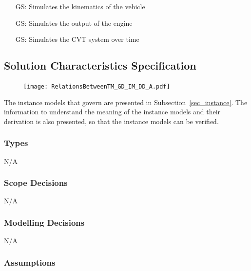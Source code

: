 \documentclass[12pt]{article}
\newcounter{goalnum} %
\begin{document}
\begin{itemize}

\item[GS\refstepcounter{goalnum}\thegoalnum \label{GS1}:]  Simulates the kinematics of the vehicle
\item[GS\refstepcounter{goalnum}\thegoalnum \label{GS2}:]  Simulates the output of the engine
\item[GS\refstepcounter{goalnum}\thegoalnum \label{GS3}:]  Simulates the CVT system over time

\end{itemize}

\subsection{Solution Characteristics Specification}
\begin{figure}[H]
  \texttt{[image: RelationsBetweenTM\_GD\_IM\_DD\_A.pdf]}
\end{figure}

The instance models that govern \progname{} are presented in
Subsection~\ref{sec_instance}.  The information to understand the meaning of the
instance models and their derivation is also presented, so that the instance
models can be verified.

\subsubsection{Types}

N/A

\subsubsection{Scope Decisions}

N/A
\subsubsection{Modelling Decisions}

N/A

\subsubsection{Assumptions} \label{sec_assumpt}
\end{document}
